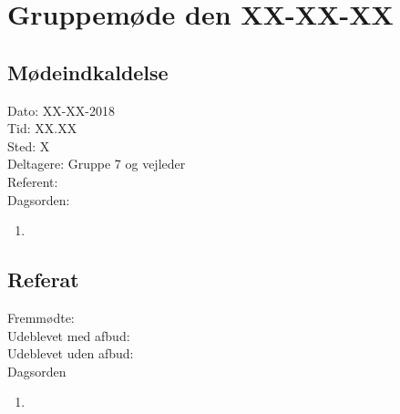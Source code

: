 \section{Gruppemøde den XX-XX-XX}
\subsection{Mødeindkaldelse}
Dato: XX-XX-2018
\\Tid: XX.XX
\\Sted: X
\\Deltagere: Gruppe 7 og vejleder
\\Referent: 
\\Dagsorden:
\begin{enumerate}
    \item 
\end{enumerate}

\subsection{Referat}
 Fremmødte: 
 \\Udeblevet med afbud:
 \\Udeblevet uden afbud: 
 \\Dagsorden 
 
 \begin{enumerate}
    \item 
\end{enumerate}
